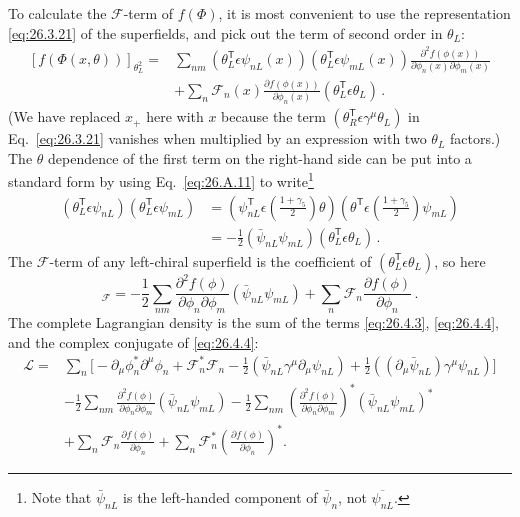 To calculate the \(\mathcal{F}\)-term of \(f(\Phi)\), it is most convenient to
use the representation \eqref{eq:26.3.21} of the superfields, and pick out the
term of second order in \(\theta_L\):
\[
  \begin{aligned}
  [f(\Phi(x,\theta))]_{\theta_L^2}
  ={}&\sum_{nm}
    (\theta_L^{\mathsf T}\epsilon\psi_{nL}(x))
    (\theta_L^{\mathsf T}\epsilon\psi_{mL}(x))
    \frac{\partial^2f(\phi(x))}
      {\partial\phi_n(x)\partial\phi_m(x)}
  \\
  &+\sum_n\mathcal{F}_n(x)
    \frac{\partial f(\phi(x))}{\partial\phi_n(x)}
    (\theta_L^{\mathsf T}\epsilon\theta_L)\,.
  \end{aligned}
\]
(We have replaced \(x_+\) here with \(x\) because the term
\((\theta_R^{\mathsf T}\epsilon\gamma^\mu\theta_L)\) in Eq.~\eqref{eq:26.3.21}
vanishes when multiplied by an expression with two \(\theta_L\) factors.)
The \(\theta\) dependence of the first term on the right-hand side can be put
into a standard form by using Eq.~\eqref{eq:26.A.11} to write\footnote{Note
that \(\bar\psi_{nL}\) is the left-handed component of \(\bar\psi_n\), not
\(\overline{\psi_{nL}}\).}
\[
  \begin{aligned}
  (\theta_L^{\mathsf T}\epsilon\psi_{nL})(\theta_L^{\mathsf T}\epsilon\psi_{mL})
  &=
  \left(\psi_{nL}^{\mathsf T}\epsilon
    \left(\frac{1+\gamma_5}{2}\right)\theta\right)
  \left(\theta^{\mathsf T}\epsilon
    \left(\frac{1+\gamma_5}{2}\right)\psi_{mL}\right)
  \\
  &=-\frac12(\bar\psi_{nL}\psi_{mL})
    (\theta_L^{\mathsf T}\epsilon\theta_L)\,.
  \end{aligned}
\]
The \(\mathcal{F}\)-term of any left-chiral superfield is the coefficient of
\((\theta_L^{\mathsf T}\epsilon\theta_L)\), so here
\begin{equation}
  [f(\Phi)]_{\mathcal{F}}
  =-\frac12\sum_{nm}
    \frac{\partial^2f(\phi)}{\partial\phi_n\partial\phi_m}
    (\bar\psi_{nL}\psi_{mL})
  +\sum_n\mathcal{F}_n\frac{\partial f(\phi)}{\partial\phi_n}\,.
  \tag{26.4.4}\label{eq:26.4.4}
\end{equation}
The complete Lagrangian density is the sum of the terms
\eqref{eq:26.4.3}, \eqref{eq:26.4.4}, and the complex conjugate of
\eqref{eq:26.4.4}:
\begin{equation}
  \begin{aligned}
  \mathcal{L}={}&
  \sum_n\biggl[
    -\partial_\mu\phi_n^*\partial^\mu\phi_n
    +\mathcal{F}_n^*\mathcal{F}_n
    -\frac12(\bar\psi_{nL}\gamma^\mu\partial_\mu\psi_{nL})
    +\frac12((\partial_\mu\bar\psi_{nL})\gamma^\mu\psi_{nL})
  \biggr]
  \\
  &-\frac12\sum_{nm}
    \frac{\partial^2f(\phi)}{\partial\phi_n\partial\phi_m}
    (\bar\psi_{nL}\psi_{mL})
  -\frac12\sum_{nm}
    \left(\frac{\partial^2f(\phi)}
      {\partial\phi_n\partial\phi_m}\right)^*
    (\bar\psi_{nL}\psi_{mL})^*
  \\
  &+\sum_n\mathcal{F}_n\frac{\partial f(\phi)}{\partial\phi_n}
  +\sum_n\mathcal{F}_n^*
    \left(\frac{\partial f(\phi)}{\partial\phi_n}\right)^* .
  \end{aligned}
  \tag{26.4.5}\label{eq:26.4.5}
\end{equation}
